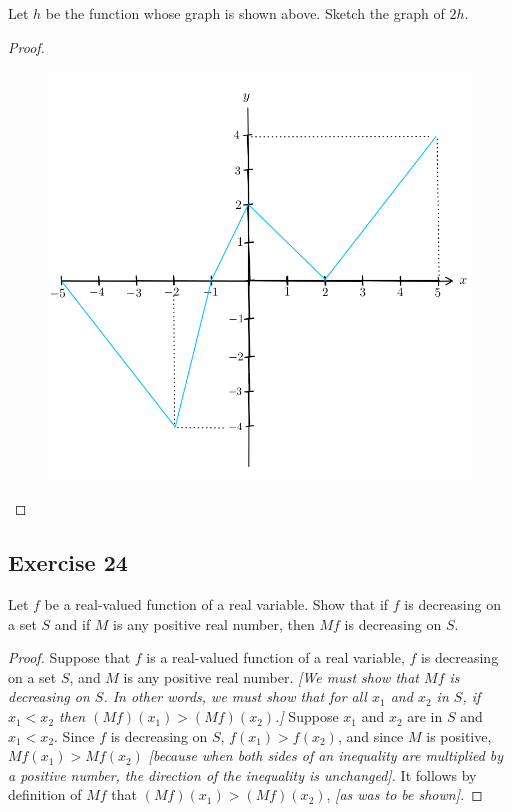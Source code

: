 \documentclass[14pt]{extarticle}
\begin{document}
Let \(h\) be the function whose graph is shown above. Sketch the graph of \(2h\).

\begin{proof}
    \begin{figure}[ht!]
        \centering
        \includegraphics[scale=0.3]{../images/11.1.23.2.png}
    \end{figure}
\end{proof}

\subsection{Exercise 24}
Let \(f\) be a real-valued function of a real variable. Show that if \(f\) is decreasing on a set \(S\) and if \(M\) is any
positive real number, then \(Mf\) is decreasing on \(S\).

\begin{proof}
    Suppose that \(f\) is a real-valued function of a real variable, \(f\) is decreasing on a set \(S\), and \(M\) is any
    positive real number. {\it [We must show that \(Mf\) is decreasing on \(S\). In other words, we must show that for all
                \(x_1\) and \(x_2\) in \(S\), if \(x_1 < x_2\) then \((Mf)(x_1) > (Mf)(x_2)\).]} Suppose \(x_1\) and \(x_2\) are in
    \(S\) and \(x_1 < x_2\). Since \(f\) is decreasing on \(S\), \(f(x_1) > f(x_2)\), and since \(M\) is positive, \(Mf(x_1) >
    Mf(x_2)\) {\it [because when both sides of an inequality are multiplied by a positive number, the direction of the
                inequality is unchanged].} It follows by definition of \(Mf\) that \((Mf)(x_1) > (Mf)(x_2)\), {\it [as was to be shown].}
\end{proof}
\end{document}
